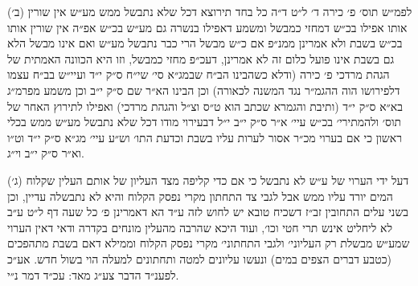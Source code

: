 \documentclass[12pt, openany]{book}
\begin{document}
\begin{multicols}{2}
(ב׳) לפמ״ש תוס׳ פ׳ כירה ד׳ ל״ט ד״ה כל בחד תירוצא דכל שלא נתבשל ממש מע״ש אין שורין אותו אפילו בכ״ש דמחזי כמבשל ומשמע דאפילו בנשרה גם מע״ש בכ״ש אפ״ה אין שורין אותו בכ״ש בשבת ולא אמרינן ממנ״פ אם כ״ש מבשל הרי כבר נתבשל מע״ש ואם אינו מבשל הלא גם בשבת אינו פועל כלום זה לא אמרינן, דעכ״פ מחזי כמבשל, וזו היא הכוונה האמתית של הגהת מרדכי פ׳ כירה (ודלא כשהבינו הב״ח שבמג״א סי׳ שי״ח ס״ק י״ד ועיי״ש בב״ח עצמו דלפירושו הוה ההגמ״ר נגד המשנה לכאורה) וכן הבינו הא״ר שם ס״ק י״ב וכן משמע מפרמ״ג בא״א ס״ק י״ד (ותיבת והגמרא שכתב הוא ט״ס וצ״ל והגהת מרדכי) ואפילו לתירוץ האחר של תוס׳ ולהמתירי׳ בכ״ש עיי׳ א״ר ס״ק י״ב י״ל דבעירוי מודו דכל שלא נתבשל מע״ש ממש בכלי ראשון כי אם בערוי מכ״ר אסור לערות עליו בשבת וכדעת התו׳ וש״ע עיי׳ מג״א ס״ק י״ד וט״ו וא״ר ס״ק י״ב וי״ג.\\\vspace{0pt}

(ג׳) דעל ידי הערוי של ע״ש לא נתבשל כי אם כדי קליפה מצד העליון של אותם העלין שקלוח המים יורד עליו ממש אבל לגבי צד התחתון מקרי נפסק הקלוח והיא לא נתבשלה עדיין, וכן בשני עלים התחובין זב״ז דשכיח טובא יש לחוש לזה ע״ד הא דאמרינן פ׳ כל שעה דף ל״ט ע״ב לא ליחליט אינש תרי חטי וכו׳, ועוד היכא שהרבה מהעלין מונחים בקדרה ודאי דאין הערוי שמע״ש מבשלת רק העליוני׳ ולגבי התחתוני׳ מקרי נפסק הקלוח וממילא דאם בשבת מתהפכים (כטבע דברים הצפים במים) ונעשו עליונים למטה ותחתונים למעלה הוי בשול חדש. אע״כ לפענ״ד הדבר צע״ג מאד: עכ״ד דמר נ״י.\\\vspace{0pt}


\end{multicols}
\end{document}
